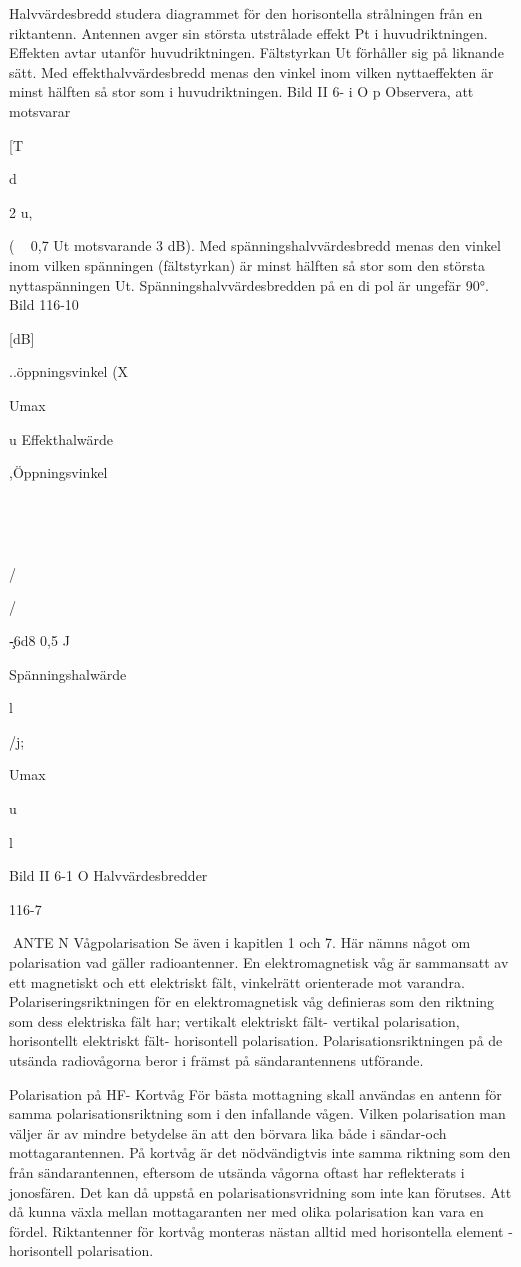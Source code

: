 {{Halvvärdesbredd
studera diagrammet för den horisontella
strålningen från en riktantenn.
Antennen avger sin största utstrålade
effekt Pt i huvudriktningen. Effekten avtar
utanför huvudriktningen. Fältstyrkan Ut förhåller sig på liknande sätt.
Med effekthalvvärdesbredd menas den
vinkel inom vilken nyttaeffekten är minst
hälften så stor som i huvudriktningen.
Bild II 6- i O
p
Observera, att
motsvarar ~

[T

d

2 u,

( ~ 0,7 Ut motsvarande 3 dB).
Med spänningshalvvärdesbredd menas
den vinkel inom vilken spänningen (fältstyrkan) är minst hälften så stor som den
största nyttaspänningen Ut. Spänningshalvvärdesbredden på en di pol är ungefär 90°.
Bild 116-10

[dB]

..öppningsvinkel (X

Umax

u
Effekthalwärde

,Öppningsvinkel

\

\

/

/

\c-6d8
0,5
J

Spänningshalwärde

l

/j;

Umax

u

l

Bild II 6-1 O Halvvärdesbredder

116-7

ANTE N
Vågpolarisation
Se även i kapitlen 1 och 7. Här nämns något
om polarisation vad gäller radioantenner.
En elektromagnetisk våg är sammansatt
av ett magnetiskt och ett elektriskt fält, vinkelrätt orienterade mot varandra.
Polariseringsriktningen för en elektromagnetisk våg definieras som den riktning
som dess elektriska fält har;
vertikalt elektriskt fält- vertikal polarisation,
horisontellt elektriskt fält- horisontell polarisation.
Polarisationsriktningen på de utsända
radiovågorna beror i främst på sändarantennens utförande.

Polarisation på HF- Kortvåg
För bästa mottagning skall användas en
antenn för samma polarisationsriktning som
i den infallande vågen. Vilken polarisation
man väljer är av mindre betydelse än att den
börvara lika både i sändar-och mottagarantennen. På kortvåg är det nödvändigtvis inte
samma riktning som den från sändarantennen, eftersom de utsända vågorna oftast
har reflekterats i jonosfären. Det kan då
uppstå en polarisationsvridning som inte
kan förutses. Att då kunna växla mellan
mottagaranten ner med olika polarisation kan
vara en fördel. Riktantenner för kortvåg monteras nästan alltid med horisontella element
-horisontell polarisation.

}}
